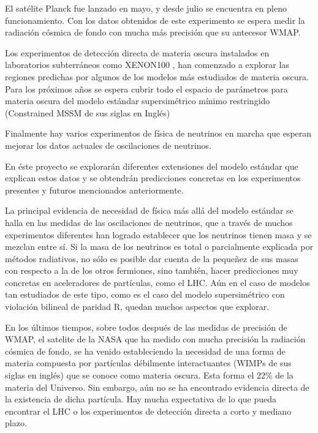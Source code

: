El satélite Planck fue lanzado en mayo, y
desde julio se encuentra en pleno funcionamiento.  Con los datos
obtenidos de este experimento se espera medir la radiación cósmica de
fondo con mucha más precisión que su antecesor WMAP. 

Los experimentos de detección directa de materia oscura instalados en
laboratorios subterráneos como XENON100 \cite{1104.3121}, han comenzado a explorar las
regiones predichas por algunos de los modelos más estudiados de
materia oscura. Para los próximos años se espera cubrir todo el espacio de parámetros para materia oscura del modelo estándar supersimétrico mínimo restringido (Constrained MSSM de sus siglas en Inglés)

Finalmente hay varios experimentos de física de neutrinos en marcha
que esperan mejorar los datos actuales de oscilaciones de neutrinos.


En éste proyecto se explorarán diferentes extensiones del modelo
estándar que explican estos datos y se obtendrán predicciones
concretas en los experimentos presentes y futuros mencionados
anteriormente.

La principal evidencia de necesidad de física más allá del modelo
estándar se halla en las medidas de las oscilaciones de neutrinos,
que a través de muchos experimentos diferentes han logrado establecer
que los neutrinos tienen masa y se mezclan entre sí. Si la masa de los
neutrinos es total o parcialmente explicada por métodos radiativos, no
sólo es posible dar cuenta de la pequeñez de sus masas con respecto a
la de los otros fermiones, sino también, hacer predicciones muy
concretas en aceleradores de partículas, como el LHC. Aún en el caso
de modelos tan estudiados de este tipo, como es el caso del modelo
supersimétrico con violación bilineal de paridad R, quedan muchos
aspectos que explorar.

En los últimos tiempos, sobre todos después de las medidas de
precisión de WMAP, el satelite de la NASA que ha medido con mucha
precisión la radiación cósmica de fondo, se ha venido estableciendo la
necesidad de una forma de materia compuesta por partículas débilmente
interactuantes (WIMPs de sus siglas en inglés) que se conoce como
materia oscura. Esta forma el 22\% de la materia del Universo. Sin
embargo, aún no se ha encontrado evidencia directa de la existencia de
dicha partícula. Hay mucha expectativa de lo que pueda encontrar el
LHC o los experimentos de detección directa a corto y mediano plazo.


